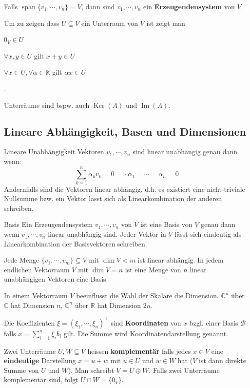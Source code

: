 \documentclass[a4paper,10pt]{article}
\DeclareMathOperator{\Image}{Im}
\DeclareMathOperator{\Kernel}{Ker}
\DeclareMathOperator{\Span}{span}
\def\R{\mathbb{R}}
\def\C{\mathbb{C}}
\def\K{\mathbb{K}}
\begin{document}
Falls $\Span \{v_1, \cdots, v_n\} = V$, dann sind $v_1, \cdots, v_n$ ein \textbf{Erzeugendensystem} von $V$.

Um zu zeigen dass $U \subseteq V$ ein Unterraum von $V$ ist zeigt man 
\begin{rowlist}
  \item $0_V \in U$
  \item $\forall x, y \in U$ gilt $x + y \in U$
  \item $\forall x \in U, \forall \alpha \in \K$ gilt $\alpha x \in U$
\end{rowlist}.

Unterräume sind bspw. auch $\Kernel(A)$ und $\Image(A)$.

\subsection{Lineare Abhängigkeit, Basen und Dimensionen}

\begin{mainbox}{Lineare Unabhängigkeit}
  Vektoren $v_1, \cdots, v_n$ sind linear unabhängig genau dann wenn:
  $$\sum_{k=1}^n \alpha_k v_k = 0 \implies \alpha_1 = \cdots = \alpha_n = 0$$
  Andernfalls sind die Vektoren linear abhängig, d.h. es existiert eine nicht-triviale Nullsumme bzw. ein Vektor lässt sich als Linearkombination der anderen schreiben.
\end{mainbox}

\begin{mainbox}{Basis}
  Ein Erzeugendensystem $v_1, \cdots, v_n$ von $V$ ist eine Basis von $V$ genau dann wenn $v_1, \cdots, v_n$ linear unabhängig sind. Jeder Vektor in $V$ lässt sich eindeutig als Linearkombination der Basisvektoren schreiben.
\end{mainbox}

Jede Menge $\{v_1, \cdots, v_m\} \subseteq V$ mit $\dim V < m$ ist linear abhängig. In jedem endlichen Vektorraum $V$ mit $\dim V = n$ ist eine Menge von $n$ linear unabhängigen Vektoren eine Basis.

In einem Vektorraum $V$ beeinflusst die Wahl der Skalare die Dimension. $\C^n$ über $\C$ hat Dimension $n$, $\C^n$ über $\R$ hat Dimension $2n$.

Die Koeffizienten $\xi = (\xi_1, \cdots, \xi_n)^\top$ sind \textbf{Koordinaten} von $x$ bzgl. einer Basis $\mathcal{B}$ falls $x = \sum_{i=1}^n \xi_i b_i$ gilt. Die Summe wird Koordinatendarstellung genannt.

Zwei Unterräume $U, W \subseteq V$ heissen \textbf{komplementär} falls jedes $x \in V$ eine \textbf{eindeutige} Darstellung $x = u + w$ mit $u \in U$ und $w \in W$ hat ($V$ ist dann direkte Summe von $U$ und $W$). Man schreibt $V = U \oplus W$. Falls zwei Unterräume komplementär sind, folgt $U \cap W = \{0_V\}$.
\end{document}
